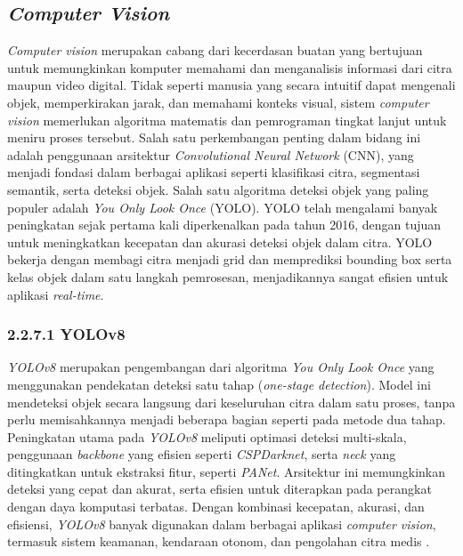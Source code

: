 \subsection{\emph{Computer Vision}}

\emph{Computer vision} merupakan cabang dari kecerdasan buatan yang bertujuan untuk memungkinkan komputer memahami dan menganalisis informasi dari citra maupun video digital. Tidak seperti manusia yang secara intuitif dapat mengenali objek, memperkirakan jarak, dan memahami konteks visual, sistem \emph{computer vision} memerlukan algoritma matematis dan pemrograman tingkat lanjut untuk meniru proses tersebut. Salah satu perkembangan penting dalam bidang ini adalah penggunaan arsitektur \emph{Convolutional Neural Network} (CNN), yang menjadi fondasi dalam berbagai aplikasi seperti klasifikasi citra, segmentasi semantik, serta deteksi objek. Salah satu algoritma deteksi objek yang paling populer adalah \emph{You Only Look Once} (YOLO). YOLO telah mengalami banyak peningkatan sejak pertama kali diperkenalkan pada tahun 2016, dengan tujuan untuk meningkatkan kecepatan dan akurasi deteksi objek dalam citra. YOLO bekerja dengan membagi citra menjadi grid dan memprediksi bounding box serta kelas objek dalam satu langkah pemrosesan, menjadikannya sangat efisien untuk aplikasi \emph{real-time}.


\subsubsection{2.2.7.1 YOLOv8}
\emph{YOLOv8} merupakan pengembangan dari algoritma \emph{You Only Look Once} yang menggunakan pendekatan deteksi satu tahap (\emph{one-stage detection}). Model ini mendeteksi objek secara langsung dari keseluruhan citra dalam satu proses, tanpa perlu memisahkannya menjadi beberapa bagian seperti pada metode dua tahap. Peningkatan utama pada \emph{YOLOv8} meliputi optimasi deteksi multi-skala, penggunaan \emph{backbone} yang efisien seperti \emph{CSPDarknet}, serta \emph{neck} yang ditingkatkan untuk ekstraksi fitur, seperti \emph{PANet}. Arsitektur ini memungkinkan deteksi yang cepat dan akurat, serta efisien untuk diterapkan pada perangkat dengan daya komputasi terbatas.  Dengan kombinasi kecepatan, akurasi, dan efisiensi, \emph{YOLOv8} banyak digunakan dalam berbagai aplikasi \emph{computer vision}, termasuk sistem keamanan, kendaraan otonom, dan pengolahan citra medis \cite{yolov8}.


